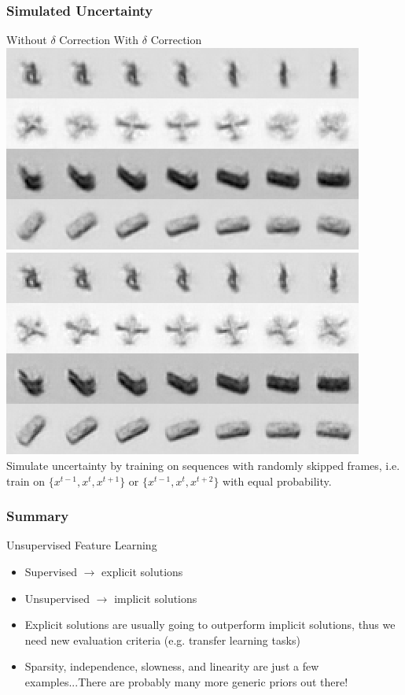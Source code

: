 \documentclass{beamer}
\begin{document}
\begin{frame} 
\frametitle{Simulated Uncertainty}
\hspace{1cm} Without $\delta$ Correction \hspace{1.75cm} With $\delta$ Correction\\
\hspace{0.5cm}\includegraphics[scale=0.3]{./Figures/Project2/taco/interp_nodelta.png} \hspace{0.5cm} 
\includegraphics[scale=0.3]{./Figures/Project2/taco/interp_delta.png}\\ \vspace{0.5cm} 
Simulate uncertainty by training on sequences with randomly skipped frames, i.e. train on $\{x^{t-1},x^t,x^{t+1}\}$ or $\{x^{t-1},x^t,x^{t+2}\}$ with equal probability.
\end{frame} 

\begin{frame}
\frametitle{Summary} 
\color{blue} Unsupervised Feature Learning
\begin{itemize} 
\item Supervised $\rightarrow$ explicit solutions
\item Unsupervised $\rightarrow$ implicit solutions
\item Explicit solutions are usually going to outperform implicit solutions, thus we need new evaluation criteria (e.g. transfer learning tasks) 
\item Sparsity, independence, slowness, and linearity are just a few examples...There are probably many more generic priors out there! 
\end{itemize} 
\end{frame} 
\end{document}
